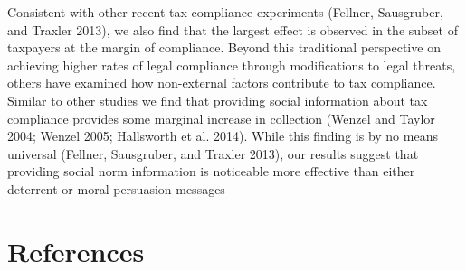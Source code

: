 \documentclass[12pt,titlepage]{article}
\begin{document}
Consistent with other recent tax compliance experiments (Fellner, Sausgruber, and Traxler 2013), we also find that the largest effect is observed 
in the subset of taxpayers at the margin of compliance.  Beyond this traditional perspective on achieving higher rates of legal compliance through modifications to legal threats, others have examined how non-external factors contribute to tax compliance. Similar to other studies we find that providing social information about tax compliance provides some marginal increase in collection (Wenzel and Taylor 2004; Wenzel 2005; Hallsworth et al. 2014). While this finding is by no means universal (Fellner, Sausgruber, and Traxler 2013), our results suggest that providing social norm information is noticeable more effective than either deterrent or moral persuasion messages

\newpage

\section*{References}
\end{document}
